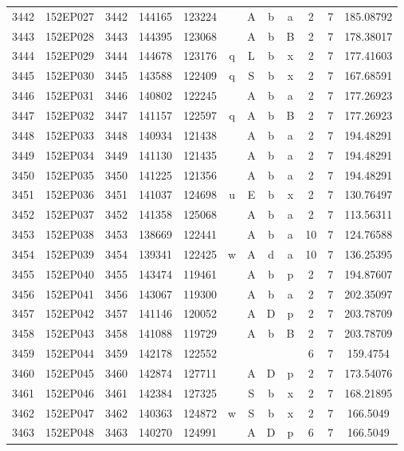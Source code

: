\begin{tabular}{|*{12}{c|}}
3442 & 152EP027 & 3442 & 144165 & 123224 &  & A & b & a & 2 & 7 & 185.08792 \\ 
3443 & 152EP028 & 3443 & 144395 & 123068 &  & A & b & B & 2 & 7 & 178.38017 \\ 
3444 & 152EP029 & 3444 & 144678 & 123176 & q & L & b & x & 2 & 7 & 177.41603 \\ 
3445 & 152EP030 & 3445 & 143588 & 122409 & q & S & b & x & 2 & 7 & 167.68591 \\ 
3446 & 152EP031 & 3446 & 140802 & 122245 &  & A & b & a & 2 & 7 & 177.26923 \\ 
3447 & 152EP032 & 3447 & 141157 & 122597 & q & A & b & B & 2 & 7 & 177.26923 \\ 
3448 & 152EP033 & 3448 & 140934 & 121438 &  & A & b & a & 2 & 7 & 194.48291 \\ 
3449 & 152EP034 & 3449 & 141130 & 121435 &  & A & b & a & 2 & 7 & 194.48291 \\ 
3450 & 152EP035 & 3450 & 141225 & 121356 &  & A & b & a & 2 & 7 & 194.48291 \\ 
3451 & 152EP036 & 3451 & 141037 & 124698 & u & E & b & x & 2 & 7 & 130.76497 \\ 
3452 & 152EP037 & 3452 & 141358 & 125068 &  & A & b & a & 2 & 7 & 113.56311 \\ 
3453 & 152EP038 & 3453 & 138669 & 122441 &  & A & b & a & 10 & 7 & 124.76588 \\ 
3454 & 152EP039 & 3454 & 139341 & 122425 & w & A & d & a & 10 & 7 & 136.25395 \\ 
3455 & 152EP040 & 3455 & 143474 & 119461 &  & A & b & p & 2 & 7 & 194.87607 \\ 
3456 & 152EP041 & 3456 & 143067 & 119300 &  & A & b & a & 2 & 7 & 202.35097 \\ 
3457 & 152EP042 & 3457 & 141146 & 120052 &  & A & D & p & 2 & 7 & 203.78709 \\ 
3458 & 152EP043 & 3458 & 141088 & 119729 &  & A & b & B & 2 & 7 & 203.78709 \\ 
3459 & 152EP044 & 3459 & 142178 & 122552 &  &  &  &  & 6 & 7 & 159.4754 \\ 
3460 & 152EP045 & 3460 & 142874 & 127711 &  & A & D & p & 2 & 7 & 173.54076 \\ 
3461 & 152EP046 & 3461 & 142384 & 127325 &  & S & b & x & 2 & 7 & 168.21895 \\ 
3462 & 152EP047 & 3462 & 140363 & 124872 & w & S & b & x & 2 & 7 & 166.5049 \\ 
3463 & 152EP048 & 3463 & 140270 & 124991 &  & A & D & p & 6 & 7 & 166.5049 \\ 

\end{tabular}
